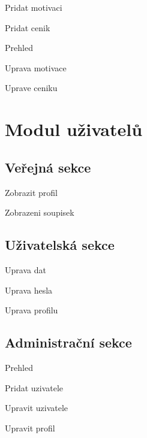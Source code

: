 \documentclass[11pt,oneside]{fithesis}
\begin{document}
            Pridat motivaci

            Pridat cenik

            Prehled

            Uprava motivace

            Uprave ceniku



        \section{Modul uživatelů}



            \subsection*{Veřejná sekce}

            Zobrazit profil

            Zobrazeni soupisek



            \subsection*{Uživatelská sekce}

            Uprava dat

            Uprava hesla

            Uprava profilu





            \subsection*{Administrační sekce}

            Prehled

            Pridat uzivatele

            Upravit uzivatele

            Upravit profil
\end{document}
